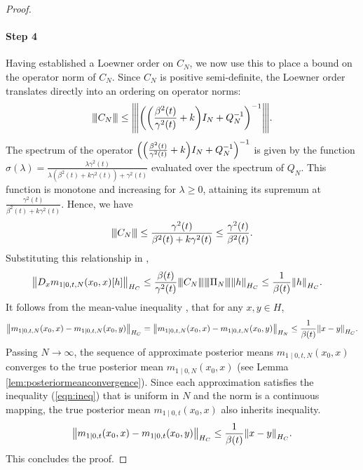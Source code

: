 \begin{proof}
  \paragraph{Step 4} Having established a Loewner order on \(C_{N}\), we now use this to place a bound on the operator norm of \(C_{N}\). Since \(C_{N}\) is positive semi-definite, the Loewner order translates directly into an ordering on operator norms:
  \[
    {\left\vert\kern-0.25ex\left\vert\kern-0.25ex\left\vert C_{N} \right\vert\kern-0.25ex\right\vert\kern-0.25ex\right\vert} \leq {\left\vert\kern-0.25ex\left\vert\kern-0.25ex\left\vert \qty(\qty(\frac{\beta^{2}(t)}{\gamma^{2}(t)} + k) I_{N} + Q_{N}^{-1})^{-1} \right\vert\kern-0.25ex\right\vert\kern-0.25ex\right\vert}.
  \] %
  The spectrum of the operator \(\qty(\qty(\frac{\beta^{2}(t)}{\gamma^{2}(t)} + k) I_{N} + Q_{N}^{-1})^{-1}\) is given by the function \(\sigma(\lambda) = \frac{\lambda \gamma^{2}(t)}{\lambda (\beta^{2}(t) + k \gamma^{2}(t)) + \gamma^{2}(t)}\) evaluated over the spectrum of \(Q_{N}\). This function is monotone and increasing for \(\lambda \geq 0\), attaining its supremum at \(\frac{\gamma^{2}(t)}{\beta^{2}(t) + k \gamma^{2}(t)}\). Hence, we have
  \[
    {\left\vert\kern-0.25ex\left\vert\kern-0.25ex\left\vert C_{N} \right\vert\kern-0.25ex\right\vert\kern-0.25ex\right\vert} \leq \frac{\gamma^{2}(t)}{\beta^{2}(t) + k \gamma^{2}(t)} \leq \frac{\gamma^{2}(t)}{\beta^{2}(t)}.
  \] Substituting this relationship in ,
  \begin{align*}
    \norm{D_{x} m_{1 \mid 0, t, N}(x_{0}, x)[h]}_{H_{C}} &\leq \frac{\beta(t)}{\gamma^{2}(t)} {\left\vert\kern-0.25ex\left\vert\kern-0.25ex\left\vert C_{N} \right\vert\kern-0.25ex\right\vert\kern-0.25ex\right\vert} {\left\vert\kern-0.25ex\left\vert\kern-0.25ex\left\vert \Pi_{N} \right\vert\kern-0.25ex\right\vert\kern-0.25ex\right\vert} \norm{h}_{H_{C}} \leq \frac{1}{\beta(t)} \norm{h}_{H_{C}}.
  \end{align*}
  It follows from the mean-value inequality \citep[][Theorem 2.1.19]{berger1977nonlinearity}, that for any \(x, y \in H\),
  \begin{equation}
    \norm{m_{1 \mid 0, t, N}(x_{0}, x) - m_{1 \mid 0, t, N}(x_{0}, y)}_{H_{C}} = \norm{m_{1 \mid 0, t, N}(x_{0}, x) - m_{1 \mid 0, t, N}(x_{0}, y)}_{H_{N}} \leq \frac{1}{\beta(t)} \norm{x - y}_{H_{C}}. \label{eqn:ineq}
  \end{equation}%
  Passing \(N \to \infty\), the sequence of approximate posterior means \(m_{1 \mid 0, t, N}(x_{0}, x)\) converges to the true posterior mean \(m_{1 \mid 0, N}(x_{0}, x)\) (see Lemma \ref{lem:posteriormeanconvergence}). Since each approximation satisfies the inequality (\ref{eqn:ineq}) that is uniform in \(N\) and the norm is a continuous mapping, the true posterior mean \(m_{1 \mid 0, t}(x_{0}, x)\) also inherits inequality.
  \[
    \norm{m_{1 \mid 0, t}(x_{0}, x) - m_{1 \mid 0, t}(x_{0}, y)}_{H_{C}} \leq \frac{1}{\beta(t)} \norm{x - y}_{H_{C}}.
  \]
  This concludes the proof.%

\end{proof}

